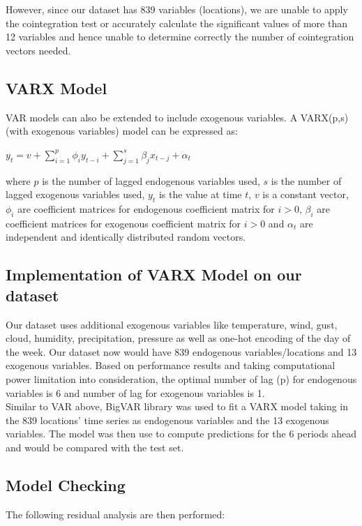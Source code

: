 \documentclass[nonblindrev,msom]{informs3} %
\begin{document}
\noindent However, since our dataset has 839 variables (locations), we are unable to apply the cointegration test or accurately calculate the significant values of more than 12 variables and hence unable to determine correctly the number of cointegration vectors needed. 

\subsection{VARX Model}
VAR models can also be extended to include exogenous variables. A VARX(p,s) (with exogenous variables) model can be expressed as:

\begin{center}
    $\displaystyle y_t=v+\sum_{i=1}^{p} \phi_{i}y_{t-i}+\sum_{j=1}^{s} \beta_{j}x_{t-j}+\alpha_t$
\end{center}

\noindent where $p$ is the number of lagged endogenous variables used, $s$ is the number of lagged exogenous variables used, $y_t$ is the value at time $t$, $v$ is a constant vector, $\phi_i$ are coefficient matrices for endogenous coefficient matrix for $i>0$, $\beta_i$ are coefficient matrices for exogenous coefficient matrix for $i>0$ and $\alpha_t$ are independent and identically distributed random vectors. 

\subsection{Implementation of VARX Model on our dataset}
\noindent Our dataset uses additional exogenous variables like temperature, wind, gust, cloud, humidity, precipitation, pressure as well as one-hot encoding of the day of the week. Our dataset now would have 839 endogenous variables/locations and 13 exogenous variables. Based on performance results and taking computational power limitation into consideration, the optimal number of lag (p) for endogenous variables is 6 and number of lag for exogenous variables is 1. \\

\noindent Similar to VAR above, BigVAR library was used to fit a VARX model taking in the 839 locations' time series as endogenous variables and the 13 exogenous variables. The model was then use to compute predictions for the 6 periods ahead and would be compared with the test set.

\newpage
\subsection{Model Checking}
The following residual analysis are then performed:
\end{document}
